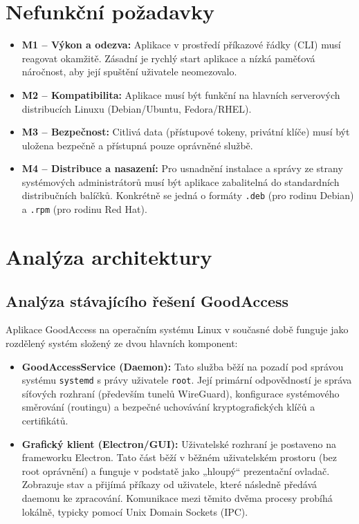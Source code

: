 \section{Nefunkční požadavky}
\label{sec:nefunkcni_pozadavky}
\begin{itemize}
    \item \textbf{M1 -- Výkon a odezva:} Aplikace v prostředí příkazové řádky (CLI) musí reagovat okamžitě. Zásadní je rychlý start aplikace a nízká paměťová náročnost, aby její spuštění uživatele neomezovalo.
    \item \textbf{M2 -- Kompatibilita:} Aplikace musí být funkční na hlavních serverových distribucích Linuxu (Debian/Ubuntu, Fedora/RHEL).
    \item \textbf{M3 -- Bezpečnost:} Citlivá data (přístupové tokeny, privátní klíče) musí být uložena bezpečně a přístupná pouze oprávněné službě.
    \item \textbf{M4 -- Distribuce a nasazení:} Pro usnadnění instalace a správy ze strany systémových administrátorů musí být aplikace zabalitelná do standardních distribučních balíčků. Konkrétně se jedná o formáty \texttt{.deb} (pro rodinu Debian) a \texttt{.rpm} (pro rodinu Red Hat).
\end{itemize}

\section{Analýza architektury}
\label{sec:analyza_architektury}
\subsection{Analýza stávajícího řešení GoodAccess}
Aplikace GoodAccess na operačním systému Linux v současné době funguje jako rozdělený systém složený ze dvou hlavních komponent:

\begin{itemize}
    \item \textbf{GoodAccessService (Daemon):} Tato služba běží na pozadí pod správou systému \texttt{systemd} s právy uživatele \texttt{root}. Její primární odpovědností je správa síťových rozhraní (především tunelů WireGuard), konfigurace systémového směrování (routingu) a bezpečné uchovávání kryptografických klíčů a certifikátů.
    \item \textbf{Grafický klient (Electron/GUI):} Uživatelské rozhraní je postaveno na frameworku Electron. Tato část běží v běžném uživatelském prostoru (bez root oprávnění) a funguje v podstatě jako „hloupý“ prezentační ovladač. Zobrazuje stav a přijímá příkazy od uživatele, které následně předává daemonu ke zpracování. Komunikace mezi těmito dvěma procesy probíhá lokálně, typicky pomocí Unix Domain Sockets (IPC).
\end{itemize}

